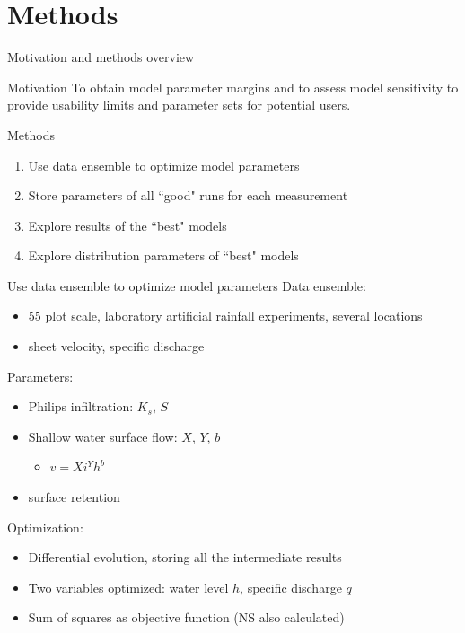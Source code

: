 \section{Methods}
\begin{frame}{Motivation and methods overview}
    
   \begin{block}{Motivation}
       To obtain model parameter margins and to assess model sensitivity to provide usability limits and parameter sets for potential users.
   \end{block}
   \bigskip
   \begin{block}{Methods}
       \begin{enumerate} 
           \item Use data ensemble to optimize model parameters 
           \item Store parameters of all ``good" runs for each measurement
           \item Explore results of the ``best" models
           \item Explore distribution parameters of ``best" models
       \end{enumerate} 
   \end{block}

   
\end{frame}


    \begin{frame}{Use data ensemble to optimize model parameters}
    \medskip
    Data ensemble: 
    \begin{itemize}
       \item 55 plot scale, laboratory artificial rainfall experiments, several locations
       \item sheet velocity, specific discharge
    \end{itemize}

    Parameters:
    \begin{itemize}
       \item Philips infiltration: $K_s$, $S$
       \item Shallow water surface flow: $X$, $Y$, $b$
       \begin{itemize}
           \item $v = Xi^Yh^b$
       \end{itemize}
       \item surface retention
    \end{itemize}

    Optimization:
    \begin{itemize}
       \item Differential evolution, storing all the intermediate results
       \item Two variables optimized: water level $h$, specific discharge $q$
       \item Sum of squares as objective function (NS also calculated)
    \end{itemize}



\end{frame}

